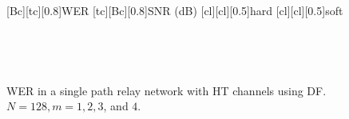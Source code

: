 \begin{figure}
    [Bc][tc][0.8]{WER}
    [tc][Bc][0.8]{SNR (dB)}
    [cl][cl][0.5]{hard}
    [cl][cl][0.5]{soft}

\centerline{
	 \\
}
\centerline{
	 \\
}
\caption{WER in a single path relay network with HT channels using DF.  $N = 128, m = 1, 2, 3$, and $4$.}
\label{fig:sp_df_wer_plots_HT}
\end{figure}

